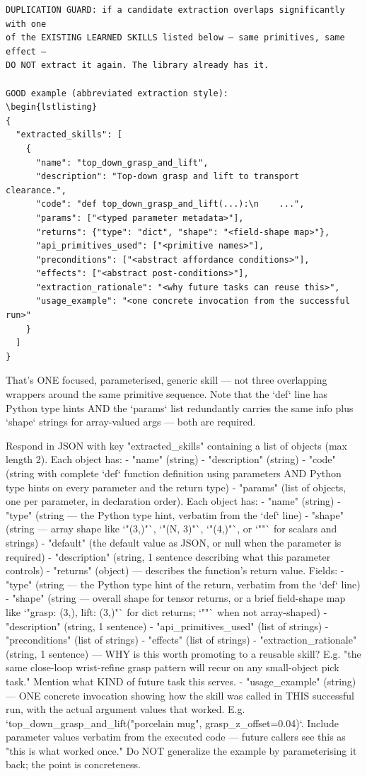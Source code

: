 \documentclass{llmxive}
\begin{document}
\begin{lstlisting}[style=ratsappendixprompt]
DUPLICATION GUARD: if a candidate extraction overlaps significantly with one
of the EXISTING LEARNED SKILLS listed below — same primitives, same effect —
DO NOT extract it again. The library already has it.

GOOD example (abbreviated extraction style):
\begin{lstlisting}
{
  "extracted_skills": [
    {
      "name": "top_down_grasp_and_lift",
      "description": "Top-down grasp and lift to transport clearance.",
      "code": "def top_down_grasp_and_lift(...):\n    ...",
      "params": ["<typed parameter metadata>"],
      "returns": {"type": "dict", "shape": "<field-shape map>"},
      "api_primitives_used": ["<primitive names>"],
      "preconditions": ["<abstract affordance conditions>"],
      "effects": ["<abstract post-conditions>"],
      "extraction_rationale": "<why future tasks can reuse this>",
      "usage_example": "<one concrete invocation from the successful run>"
    }
  ]
}
\end{lstlisting}
That's ONE focused, parameterised, generic skill — not three overlapping
wrappers around the same primitive sequence. Note that the `def` line has
Python type hints AND the `params` list redundantly carries the same info
plus `shape` strings for array-valued args — both are required.

Respond in JSON with key "extracted_skills" containing a list of objects
(max length 2). Each object has:
- "name" (string)
- "description" (string)
- "code" (string with complete `def` function definition using parameters
AND Python type hints on every parameter and the return type)
- "params" (list of objects, one per parameter, in declaration order). Each
object has:
  - "name" (string)
  - "type" (string — the Python type hint, verbatim from the `def` line)
  - "shape" (string — array shape like `"(3,)"`, `"(N, 3)"`, `"(4,)"`, or
  `""` for scalars and strings)
  - "default" (the default value as JSON, or null when the parameter is
  required)
  - "description" (string, 1 sentence describing what this parameter
  controls)
- "returns" (object) — describes the function's return value. Fields:
  - "type" (string — the Python type hint of the return, verbatim from the
  `def` line)
  - "shape" (string — overall shape for tensor returns, or a brief
  field-shape map like `"{grasp: (3,), lift: (3,)}"` for dict returns;
  `""` when not array-shaped)
  - "description" (string, 1 sentence)
- "api_primitives_used" (list of strings)
- "preconditions" (list of strings)
- "effects" (list of strings)
- "extraction_rationale" (string, 1 sentence) — WHY is this worth promoting
to a reusable skill? E.g. "the same close-loop wrist-refine grasp pattern
will recur on any small-object pick task." Mention what KIND of future task
this serves.
- "usage_example" (string) — ONE concrete invocation showing how the skill
was called in THIS successful run, with the actual argument values that
worked. E.g. `top_down_grasp_and_lift("porcelain mug",
grasp_z_offset=0.04)`. Include parameter values verbatim from the executed
code — future callers see this as "this is what worked once." Do NOT
generalize the example by parameterising it back; the point is concreteness.
\end{document}
